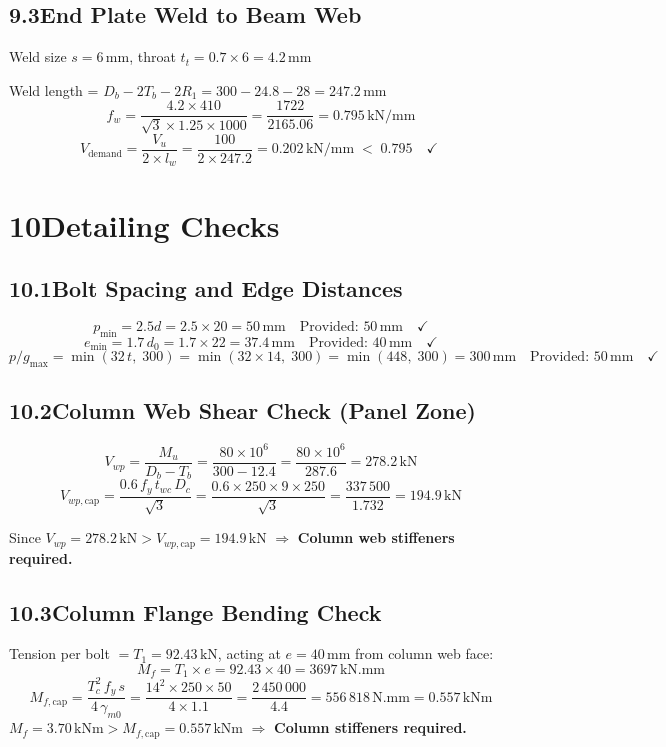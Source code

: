 \documentclass[12pt,a4paper]{article}
\newcommand{\kN}{\,\text{kN}}
\newcommand{\kNm}{\,\text{kNm}}
\newcommand{\mm}{\,\text{mm}}
\begin{document}
\subsection{9.3\quad End Plate Weld to Beam Web}
Weld size $s = 6\mm$, throat $t_t = 0.7\times 6 = 4.2\mm$

Weld length = $D_b - 2T_b - 2R_1 = 300-24.8-28 = 247.2\mm$
\[
  f_w = \frac{4.2\times 410}{\sqrt{3}\times 1.25\times 1000} = \frac{1722}{2165.06} = \boxed{0.795\,\text{kN/mm}}
  \tag{IS 800 Cl.10.5.7.1.1}
\]
\[
  V_{\text{demand}} = \frac{V_u}{2\times l_w} = \frac{100}{2\times 247.2} = 0.202\,\text{kN/mm}
  \;<\; 0.795 \quad\checkmark\;
\]

\section{10\quad Detailing Checks}

\subsection{10.1\quad Bolt Spacing and Edge Distances}
\[
  p_{\min} = 2.5d = 2.5\times 20 = 50\mm \quad\text{Provided: }50\mm \quad\checkmark
\]
\[
  e_{\min} = 1.7\,d_0 = 1.7\times 22 = 37.4\mm \quad\text{Provided: }40\mm \quad\checkmark
\]
\[
  p/g_{\max} = \min(32\,t,\;300) = \min(32\times 14,\;300) = \min(448,\;300) = 300\mm
  \quad\text{Provided: }50\mm \quad\checkmark
\]

\subsection{10.2\quad Column Web Shear Check (Panel Zone)}
\[
  V_{wp} = \frac{M_u}{D_b - T_b} = \frac{80\times 10^6}{300-12.4} = \frac{80\times 10^6}{287.6} = 278.2\kN
\]
\[
  V_{wp,\text{cap}} = \frac{0.6\,f_y\,t_{wc}\,D_c}{\sqrt{3}}
                    = \frac{0.6\times 250\times 9\times 250}{\sqrt{3}}
                    = \frac{337\,500}{1.732}
                    = \boxed{194.9\kN}
\]

Since $V_{wp} = 278.2\kN > V_{wp,\text{cap}} = 194.9\kN$ $\Rightarrow$ \textbf{Column web stiffeners required.}

\subsection{10.3\quad Column Flange Bending Check}
Tension per bolt $= T_1 = 92.43\kN$, acting at $e = 40\mm$ from column web face:
\[
  M_f = T_1\times e = 92.43\times 40 = 3697\,\text{kN.mm}
\]
\[
  M_{f,\text{cap}} = \frac{T_c^2\,f_y\,s}{4\,\gamma_{m0}}
                   = \frac{14^2\times 250\times 50}{4\times 1.1}
                   = \frac{2\,450\,000}{4.4}
                   = 556\,818\,\text{N.mm} = 0.557\kNm
\]
$M_f = 3.70\kNm > M_{f,\text{cap}} = 0.557\kNm$ $\Rightarrow$ \textbf{Column stiffeners required.}
\end{document}
